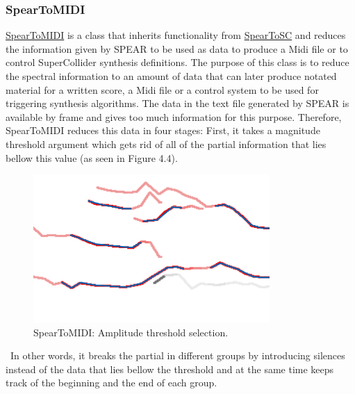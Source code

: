 \subsubsection{SpearToMIDI}

\href{http://github.com/freuben/FedeLib/blob/master/SpearToSC/SpearToMIDI.sc}{SpearToMIDI} is a class that inherits functionality from \hyperlink{spearsc}{SpearToSC} and reduces the information given by SPEAR to be used as data to produce a Midi file or to control SuperCollider synthesis definitions. The purpose of this class is to reduce the spectral information to an amount of data that can later produce notated material for a written score, a Midi file or a control system to be used for triggering synthesis algorithms. The data in the text file generated by SPEAR is available by frame and gives too much information for this purpose. Therefore, SpearToMIDI reduces this data in four stages: First, it takes a magnitude threshold argument which gets rid of all of the partial information that lies bellow this value (as seen in Figure 4.4).
\begin{figure}[htbp] %
   \centering
   \includegraphics[width=9cm]{Chapter6/Spear2.tif} %
   \caption{SpearToMIDI: Amplitude threshold selection.}
   \label{fig:example}
\end{figure}\
In other words, it breaks the partial in different groups by introducing silences instead of the data that lies bellow the threshold and at the same time keeps track of the beginning and the end of each group. 

